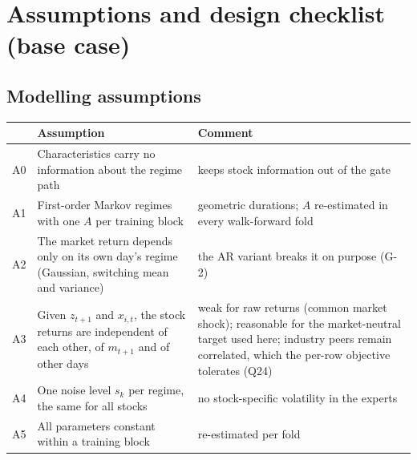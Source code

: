 \section{Assumptions and design checklist (base case)}

\subsection{Modelling assumptions}
\begin{center}
\renewcommand{\arraystretch}{1.3}
\begin{tabularx}{\textwidth}{@{}lXX@{}}
\toprule
 & Assumption & Comment \\
\midrule
A0 & Characteristics carry no information about the regime path & keeps stock information out of the gate \\
A1 & First-order Markov regimes with one $A$ per training block & geometric durations; $A$ re-estimated in every walk-forward fold \\
A2 & The market return depends only on its own day's regime (Gaussian, switching mean and variance) & the AR variant breaks it on purpose (G-2) \\
A3 & Given $z_{t+1}$ and $x_{i,t}$, the stock returns are independent of each other, of $m_{t+1}$ and of other days & weak for raw returns (common market shock); reasonable for the market-neutral target used here; industry peers remain correlated, which the per-row objective tolerates (Q24) \\
A4 & One noise level $s_k$ per regime, the same for all stocks & no stock-specific volatility in the experts \\
A5 & All parameters constant within a training block & re-estimated per fold \\
\bottomrule
\end{tabularx}
\end{center}

